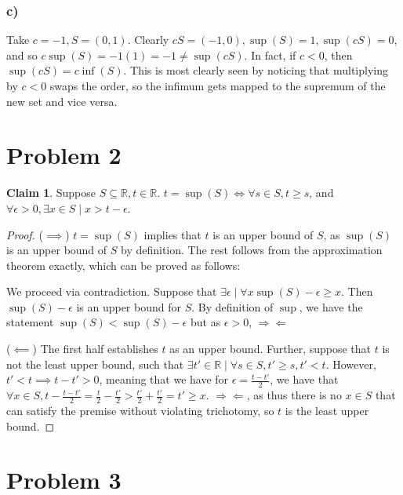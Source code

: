 \documentclass[12pt,letterpaper]{article}
\theoremstyle{definition}
\newtheorem*{claim}{Claim}
\newcommand{\contra}{\Rightarrow\!\Leftarrow}
\newcommand{\R}{\mathbb{R}}
\begin{document}
\subsubsection*{c)}

Take $c = -1, S = (0,1)$. Clearly $cS = (-1,0), \sup(S) = 1, \sup(cS) = 0$, and
so $c\sup(S) = -1(1) = -1 \neq \sup(cS)$. In fact, if $c<0$, then $\sup(cS) =
c\inf(S)$. This is most clearly seen by noticing that multiplying by $c < 0$
swaps the order, so the infimum gets mapped to the supremum of the new set and
vice versa.

\section*{Problem 2}

\begin{claim}
  Suppose $S \subseteq \R, t \in \R$. $t = \sup(S) \iff \forall s \in S, t \geq
  s$, and $\forall \epsilon > 0, \exists x \in S \mid x > t - \epsilon$.
\end{claim}

\begin{proof}
  ($\implies$) $t = \sup(S)$ implies that $t$ is an upper bound of $S$, as
  $\sup(S)$ is an upper bound of $S$ by definition. The rest follows from the
  approximation theorem exactly, which can be proved as follows: 

  We proceed via contradiction. Suppose that $\exists \epsilon \mid \forall x \sup(S) - \epsilon \geq x$.
  Then $\sup(S) - \epsilon$ is an upper bound for $S$.
  By definition of $\sup$, we have the statement $\sup(S) < \sup (S) - \epsilon$
  but as $\epsilon > 0$, $\contra$

  ($\impliedby$) The first half establishes $t$ as an upper bound. Further,
  suppose that $t$ is not the least upper bound, such that $\exists t'  \in \R \mid
  \forall s \in S, t' \geq s, t' < t$. However, $t' < t \implies t - t' > 0$,
  meaning that we have for $\epsilon = \frac{t - t'}{2}$, we have that $\forall x \in
  S, t - \frac{t - t'}{2} = \frac{t}{2} - \frac{t'}{2} > \frac{t'}{2} +
  \frac{t'}{2} = t' \geq x$. $\contra$, as thus there is no $x \in S$
  that can satisfy the premise without violating trichotomy, so $t$ is the least upper bound.
\end{proof}

\section*{Problem 3}
\end{document}
